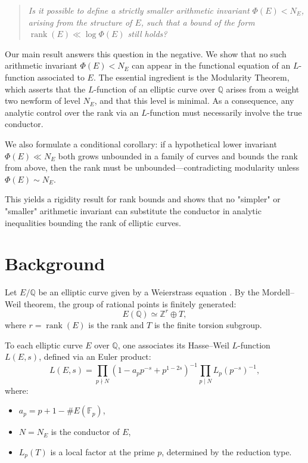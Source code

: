 \documentclass[a4paper,11pt]{article}
\theoremstyle{thmstyleone}%
\theoremstyle{thmstyletwo}%
\theoremstyle{thmstylethree}%
\begin{document}
	\medskip
	\begin{quote}
		\emph{Is it possible to define a strictly smaller arithmetic invariant \( \Phi(E) < N_E \), arising from the structure of \( E \), such that a bound of the form \( \operatorname{rank}(E) \ll \log \Phi(E) \) still holds?}
	\end{quote}
	\medskip
	
	Our main result answers this question in the negative. We show that no such arithmetic invariant \( \Phi(E) < N_E \) can appear in the functional equation of an \( L \)-function associated to \( E \). The essential ingredient is the Modularity Theorem, which asserts that the \( L \)-function of an elliptic curve over \( \mathbb{Q} \) arises from a weight two newform of level \( N_E \), and that this level is minimal. As a consequence, any analytic control over the rank via an \( L \)-function must necessarily involve the true conductor.
	
	We also formulate a conditional corollary: if a hypothetical lower invariant \( \Phi(E) \ll N_E \) both grows unbounded in a family of curves and bounds the rank from above, then the rank must be unbounded—contradicting modularity unless \( \Phi(E) \sim N_E \).
	
	This yields a rigidity result for rank bounds and shows that no "simpler" or "smaller" arithmetic invariant can substitute the conductor in analytic inequalities bounding the rank of elliptic curves.
	
	\section{Background}
	
	Let \( E/\mathbb{Q} \) be an elliptic curve given by a Weierstrass equation \cite{silverman2009arithmetic}. By the Mordell–Weil theorem, the group of rational points is finitely generated:
	\[
	E(\mathbb{Q}) \simeq \mathbb{Z}^r \oplus T,
	\]
	where \( r = \operatorname{rank}(E) \) is the rank and \( T \) is the finite torsion subgroup.
	
	To each elliptic curve \( E \) over \( \mathbb{Q} \), one associates its Hasse–Weil \( L \)-function \( L(E, s) \), defined via an Euler product:
	\[
	L(E, s) = \prod_{p \nmid N} \left(1 - a_p p^{-s} + p^{1-2s}\right)^{-1} \prod_{p \mid N} L_p(p^{-s})^{-1},
	\]
	where:
	\begin{itemize}
		\item \( a_p = p + 1 - \#E(\mathbb{F}_p) \),
		\item \( N = N_E \) is the conductor of \( E \),
		\item \( L_p(T) \) is a local factor at the prime \( p \), determined by the reduction type.
	\end{itemize}
	
\end{document}
